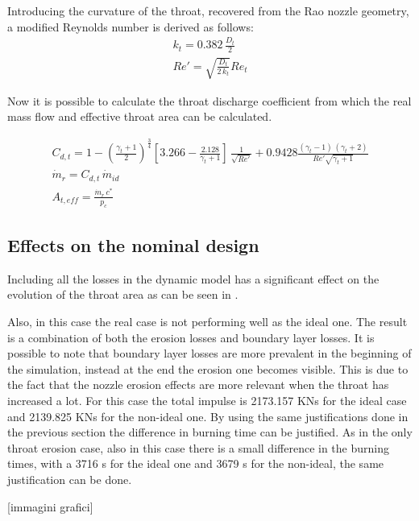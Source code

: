 \begin{itemize}
    Introducing the curvature of the throat, recovered from the Rao nozzle geometry, a modified Reynolds number is derived as follows:
    \begin{gather}
        k_t = 0.382 \, \frac{D_t}{2} \\
        Re'=\sqrt{\frac{D_t}{2 \, k_t}}Re_t
    \end{gather}  

    Now it is possible to calculate the throat discharge coefficient from which the real mass flow and effective throat area can be calculated.  

    \begin{gather}
        C_{d,t} = 1 - \left( \frac{\gamma_t+1}{2} \right)^{\frac{3}{4}}
        \left[3.266 - \frac{2.128}{\gamma_t+1} \right] \, \frac{1}{\sqrt{Re'}} + 0.9428 \frac{(\gamma_t - 1) \, (\gamma_t + 2)}{Re' \sqrt{\gamma_t + 1}} \\
        \dot{m}_r = C_{d,t} \, \dot{m}_{id} \\
        A_{t,eff} = \frac{\dot{m}_r \, c^*}{p_c}
    \end{gather}
\end{itemize}

\subsection{Effects on the nominal design}  

Including all the losses in the dynamic model has a significant effect on the evolution of the throat area as can be seen in \mref.


Also, in this case the real case is not performing well as the ideal one. The result is a combination of both the erosion losses and boundary layer losses. It is possible to note that boundary layer losses are more prevalent in the beginning of the simulation, instead at the end the erosion one becomes visible. This is due to the fact that the nozzle erosion effects are more relevant when the throat has increased a lot. For this case the total impulse is 2173.157 KNs for the ideal case and 2139.825 KNs for the non-ideal one. By using the same justifications done in the previous section the difference in burning time can be justified. As in the only throat erosion case, also in this case there is a small difference in the burning times, with a 3716 s for the ideal one and 3679 s for the non-ideal, the same justification can be done. 

[immagini grafici]       